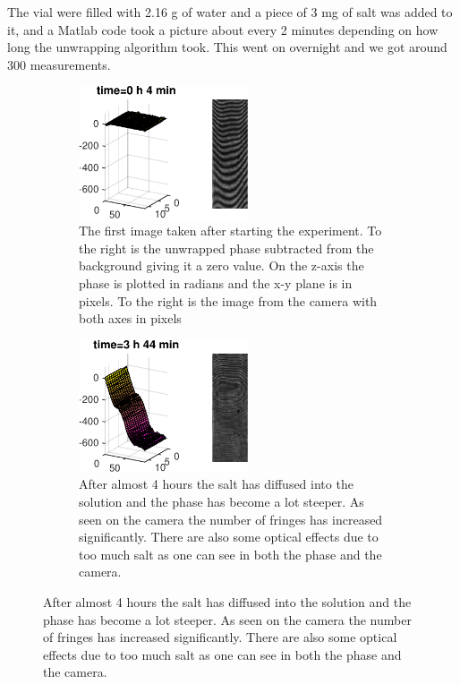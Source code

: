 The vial were filled with 2.16 g of water and a piece of 3 mg of salt was added to it,
and a Matlab code took a picture about every 2 minutes depending on how long the 
unwrapping algorithm took. This went on overnight and we got around 300 measurements.
\begin {figure}[ht!]
\begin {subfigure}[h]{0.35\textwidth}
\includegraphics [frame,width=5cm]{bilder/diff2.pdf}
\caption {The first image taken after starting the experiment. To the right is the
unwrapped phase subtracted from the background giving it a zero value. On the z-axis
the phase is plotted in radians and the x-y plane is in pixels. To the right
is the image from the camera with both axes in pixels}
\label {diff1}
\end {subfigure}
\hfill
\begin {subfigure}[h]{0.35\textwidth}
\includegraphics [frame,width=5cm]{bilder/diff102.pdf}
\caption {After almost 4 hours the salt has diffused into the solution and the phase
has become a lot steeper. As seen on the camera the number of fringes has increased
significantly. There are also some optical effects due to too much salt as one can
see in both the phase and the camera.}
\label {diff2}
\end {subfigure}


\end{figure}

